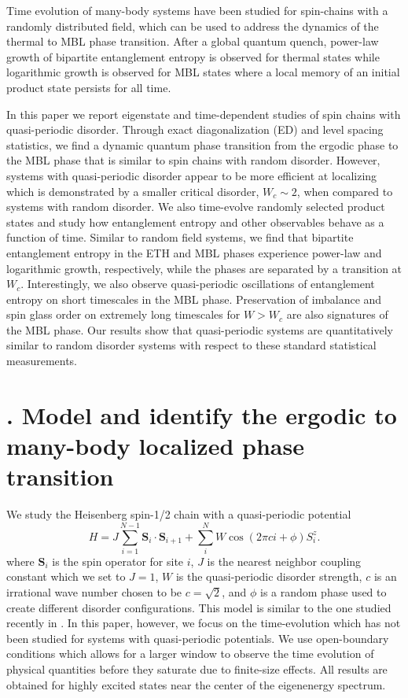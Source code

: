 \documentclass[prl,aps,epsf,showpacs,twocolumn,letterpaper]{revtex4}
\let\oldsection\section
\renewcommand{\section}[1]{\stepcounter{section}\oldsection{\Roman{section}. #1}}
\begin{document}
Time evolution of many-body systems have been studied for spin-chains with a randomly distributed field\cite{kjall2014,luitz2016time}, which can be used to address the dynamics of the thermal to MBL phase transition\cite{nandkishore2015,vosk_theory2014,potter2015}.  After a global quantum quench, power-law growth of bipartite entanglement entropy is observed for thermal states while logarithmic growth is observed for MBL states where a local memory of an initial product state persists for all time\cite{luitz2016time}.

In this paper we report eigenstate and time-dependent studies of spin chains with quasi-periodic disorder.  Through exact diagonalization (ED) and level spacing statistics, we find a dynamic quantum phase transition from the ergodic phase to the MBL phase that is similar to spin chains with random disorder.  However, systems with quasi-periodic disorder appear to be more efficient at localizing which is demonstrated by a smaller critical disorder, $W_c \sim 2$, when compared to systems with random disorder.  We also time-evolve randomly selected product states and study how entanglement entropy and other observables behave as a function of time.  Similar to random field systems, we find that bipartite entanglement entropy in the ETH and MBL phases experience power-law and logarithmic growth, respectively, while the phases are separated by a transition at $W_c$.  Interestingly, we also observe quasi-periodic oscillations of entanglement entropy on short timescales in the MBL phase.  Preservation of imbalance and spin glass order on extremely long timescales for $W > W_c$ are also signatures of the MBL phase.  Our results show that quasi-periodic systems are quantitatively similar to random disorder systems with respect to these standard statistical measurements.


\section{Model and identify the ergodic to many-body localized phase transition}


We study the Heisenberg spin-1/2 chain with a quasi-periodic potential
\begin{equation}
H = J\sum_{i=1}^{N-1} \mathbf{S}_i \cdot \mathbf{S}_{i+1} + \sum_{i}^{N} W\cos(2\pi c i+\phi) S_i^z \text{.}
\end{equation}
where $\mathbf{S}_i$ is the spin operator for site $i$, $J$ is the nearest neighbor coupling constant which we set to $J=1$, $W$ is the quasi-periodic disorder strength, $c$ is an irrational wave number chosen to be $c=\sqrt{2}$, and $\phi$ is a random phase used to create different disorder configurations.  This model is similar to the one studied recently in \cite{vedika2016}.  In this paper, however, we focus on the time-evolution which has not been studied for systems with quasi-periodic potentials.  We use open-boundary conditions which allows for a larger window to observe the time evolution of physical quantities\cite{luitz2016time} before they saturate due to finite-size effects.  All results are obtained for highly excited states near the center of the eigenenergy spectrum.
\end{document}

